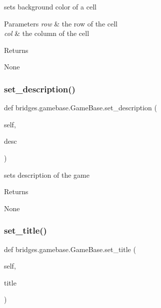 sets background color of a cell 


\begin{DoxyParams}{Parameters}
{\em row} & the row of the cell \\
\hline
{\em col} & the column of the cell\\
\hline
\end{DoxyParams}
\begin{DoxyReturn}{Returns}


None 
\end{DoxyReturn}
\mbox{\label{classbridges_1_1gamebase_1_1_game_base_a75ecd56daf08036207772d6ce81c90b1}} 
\subsubsection{\texorpdfstring{set\_description()}{set\_description()}}
{\footnotesize\ttfamily def bridges.\+gamebase.\+Game\+Base.\+set\+\_\+description (\begin{DoxyParamCaption}\item[{}]{self,  }\item[{}]{desc }\end{DoxyParamCaption})}



sets description of the game 

\begin{DoxyReturn}{Returns}


None 
\end{DoxyReturn}
\mbox{\label{classbridges_1_1gamebase_1_1_game_base_a7e7d4033c4b191b3699dbf0cb5f25933}} 
\subsubsection{\texorpdfstring{set\_title()}{set\_title()}}
{\footnotesize\ttfamily def bridges.\+gamebase.\+Game\+Base.\+set\+\_\+title (\begin{DoxyParamCaption}\item[{}]{self,  }\item[{}]{title }\end{DoxyParamCaption})}



